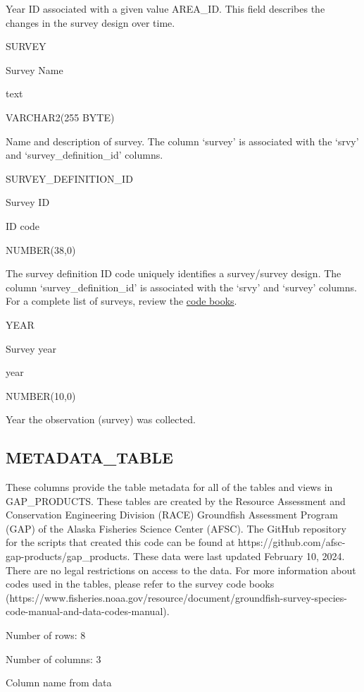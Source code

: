 \documentclass[
  letterpaper,
  oneside,
  open=any]{scrbook}
\begin{document}
Year ID associated with a given value AREA\_ID. This field describes the
changes in the survey design over time.

SURVEY

Survey Name

text

VARCHAR2(255 BYTE)

Name and description of survey. The column `survey' is associated with
the `srvy' and `survey\_definition\_id' columns.

SURVEY\_DEFINITION\_ID

Survey ID

ID code

NUMBER(38,0)

The survey definition ID code uniquely identifies a survey/survey
design. The column `survey\_definition\_id' is associated with the
`srvy' and `survey' columns. For a complete list of surveys, review the
\href{https://www.fisheries.noaa.gov/resource/document/groundfish-survey-species-code-manual-and-data-codes-manual}{code
books}.

YEAR

Survey year

year

NUMBER(10,0)

Year the observation (survey) was collected.

\hypertarget{metadata_table}{%
\subsection{METADATA\_TABLE}\label{metadata_table}}

These columns provide the table metadata for all of the tables and views
in GAP\_PRODUCTS. These tables are created by the Resource Assessment
and Conservation Engineering Division (RACE) Groundfish Assessment
Program (GAP) of the Alaska Fisheries Science Center (AFSC). The GitHub
repository for the scripts that created this code can be found at
https://github.com/afsc-gap-products/gap\_products. These data were last
updated February 10, 2024. There are no legal restrictions on access to
the data. For more information about codes used in the tables, please
refer to the survey code books
(https://www.fisheries.noaa.gov/resource/document/groundfish-survey-species-code-manual-and-data-codes-manual).

Number of rows: 8

Number of columns: 3

Column name from data
\end{document}
